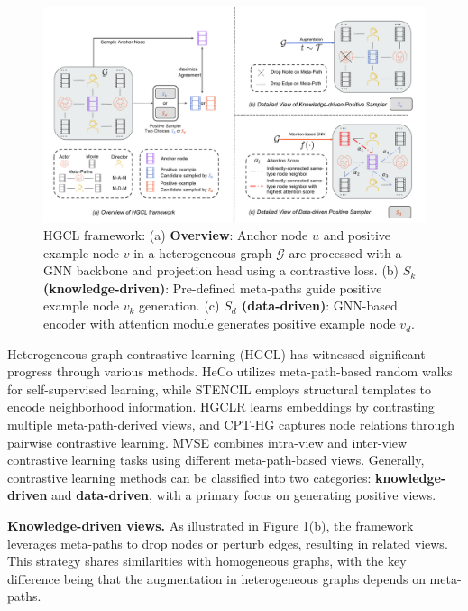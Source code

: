 \documentclass[11pt]{article}
\begin{document}
\begin{figure}
  \centering
  \includegraphics[width=0.95\linewidth]{submissions/Yan2023/figures/heterographcl.pdf}
  \caption{HGCL framework: (a) \textbf{Overview}: Anchor node $u$ and positive example node $v$ in a heterogeneous graph $\mathcal{G}$ are processed with a GNN backbone and projection head using a contrastive loss. (b) \textbf{$S_k$ (knowledge-driven)}: Pre-defined meta-paths guide positive example node $v_k$ generation. (c) \textbf{$S_d$ (data-driven)}: GNN-based encoder with attention module generates positive example node $v_d$.}
  \label{heterocl}
\end{figure}

Heterogeneous graph contrastive learning (HGCL) has witnessed significant progress through various methods. HeCo \cite{wang2021self} utilizes meta-path-based random walks for self-supervised learning, while STENCIL \cite{zhu2022structure} employs structural templates to encode neighborhood information. HGCLR \cite{chen2023heterogeneous} learns embeddings by contrasting multiple meta-path-derived views, and CPT-HG \cite{jiang2021contrastive} captures node relations through pairwise contrastive learning. MVSE \cite{zhao2021multi} combines intra-view and inter-view contrastive learning tasks using different meta-path-based views. Generally, contrastive learning methods can be classified into two categories: \textbf{knowledge-driven} and \textbf{data-driven}, with a primary focus on generating positive views.

\textbf{Knowledge-driven views.}
As illustrated in Figure \ref{heterocl}(b), the framework leverages meta-paths to drop nodes or perturb edges, resulting in related views. This strategy shares similarities with homogeneous graphs, with the key difference being that the augmentation in heterogeneous graphs depends on meta-paths.
\end{document}
